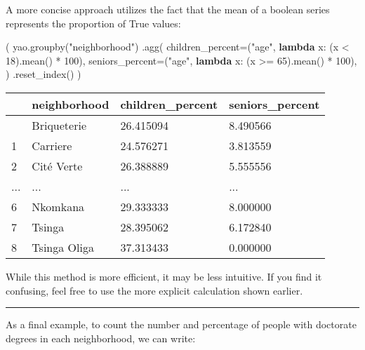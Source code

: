 \documentclass[
  letterpaper,
  DIV=11,
  numbers=noendperiod]{scrreprt}
\newenvironment{Shaded}{\begin{snugshade}}{\end{snugshade}}
\newcommand{\DecValTok}[1]{\textcolor[rgb]{0.68,0.00,0.00}{#1}}
\newcommand{\KeywordTok}[1]{\textcolor[rgb]{0.00,0.23,0.31}{\textbf{#1}}}
\newcommand{\NormalTok}[1]{\textcolor[rgb]{0.00,0.23,0.31}{#1}}
\newcommand{\OperatorTok}[1]{\textcolor[rgb]{0.37,0.37,0.37}{#1}}
\newcommand{\StringTok}[1]{\textcolor[rgb]{0.13,0.47,0.30}{#1}}
\begin{document}
A more concise approach utilizes the fact that the mean of a boolean
series represents the proportion of True values:

\begin{Shaded}
\begin{Highlighting}[]
\NormalTok{(}
\NormalTok{    yao.groupby(}\StringTok{"neighborhood"}\NormalTok{)}
\NormalTok{    .agg(}
\NormalTok{        children\_percent}\OperatorTok{=}\NormalTok{(}\StringTok{"age"}\NormalTok{, }\KeywordTok{lambda}\NormalTok{ x: (x }\OperatorTok{\textless{}} \DecValTok{18}\NormalTok{).mean() }\OperatorTok{*} \DecValTok{100}\NormalTok{),}
\NormalTok{        seniors\_percent}\OperatorTok{=}\NormalTok{(}\StringTok{"age"}\NormalTok{, }\KeywordTok{lambda}\NormalTok{ x: (x }\OperatorTok{\textgreater{}=} \DecValTok{65}\NormalTok{).mean() }\OperatorTok{*} \DecValTok{100}\NormalTok{),}
\NormalTok{    )}
\NormalTok{    .reset\_index()}
\NormalTok{)}
\end{Highlighting}
\end{Shaded}

\begin{longtable}[]{@{}llll@{}}
\toprule\noalign{}
& neighborhood & children\_percent & seniors\_percent \\
\midrule\noalign{}
\endhead
\bottomrule\noalign{}
\endlastfoot
0 & Briqueterie & 26.415094 & 8.490566 \\
1 & Carriere & 24.576271 & 3.813559 \\
2 & Cité Verte & 26.388889 & 5.555556 \\
... & ... & ... & ... \\
6 & Nkomkana & 29.333333 & 8.000000 \\
7 & Tsinga & 28.395062 & 6.172840 \\
8 & Tsinga Oliga & 37.313433 & 0.000000 \\
\end{longtable}

While this method is more efficient, it may be less intuitive. If you
find it confusing, feel free to use the more explicit calculation shown
earlier.

\begin{center}\rule{0.5\linewidth}{0.5pt}\end{center}

As a final example, to count the number and percentage of people with
doctorate degrees in each neighborhood, we can write:
\end{document}
